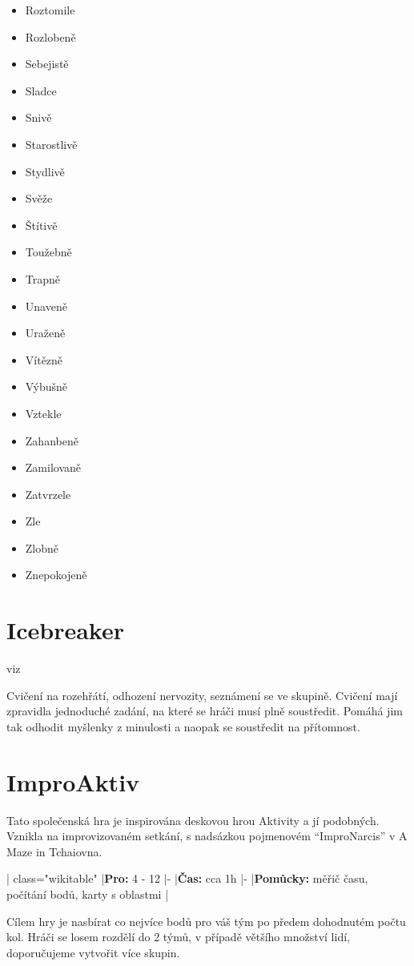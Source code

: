 \begin{multicols}{3}
\begin{itemize}
\item  Roztomile
\item  Rozlobeně
\item  Sebejistě
\item  Sladce
\item  Snivě
\item  Starostlivě
\item  Stydlivě
\item  Svěže
\item  Štítivě
\item  Toužebně
\item  Trapně
\item  Unaveně
\item  Uraženě
\item  Vítězně
\item  Výbušně
\item  Vztekle
\item  Zahanbeně
\item  Zamilovaně
\item  Zatvrzele
\item  Zle
\item  Zlobně
\item  Znepokojeně
\end{itemize}
\end{multicols} 
 
\needspace{5cm} \section{Icebreaker} \label{icebreaker} viz  
 
Cvičení na rozehřátí, odhození nervozity, seznámení se ve skupině. Cvičení mají zpravidla jednoduché zadání, na které se hráči musí plně soustředit. Pomáhá jim tak odhodit myšlenky z minulosti a naopak se soustředit na přítomnost. 
\needspace{5cm} \section{ImproAktiv} \label{improaktiv} Tato společenská hra je inspirována deskovou hrou Aktivity a jí podobných. Vznikla na improvizovaném setkání, s nadsázkou pojmenovém “ImproNarcis” v A Maze in Tchaiovna. 
 
{| class="wikitable" 
|\textbf{Pro:}{} 4  - 12 
|- 
|\textbf{Čas:}{} cca 1h 
|- 
|\textbf{Pomůcky:}{} měřič času, počítání bodů, karty s oblastmi 
|} 
 
Cílem hry je nasbírat co nejvíce bodů pro váš tým po předem dohodnutém počtu kol. Hráči se losem rozdělí do 2 týmů, v případě většího množství lidí, doporučujeme vytvořit více skupin. 
 
